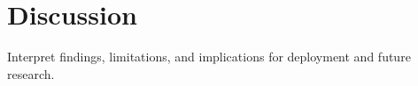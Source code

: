 \chapter{Discussion}

Interpret findings, limitations, and implications for deployment and future research.

